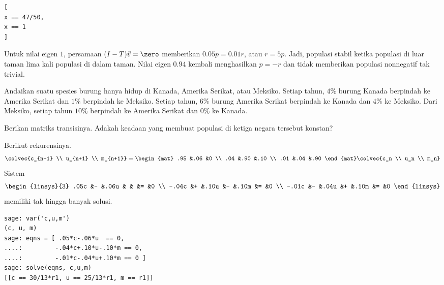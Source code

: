 \begin{exercises}
\begin{answer}
\begin{lstlisting}
[
x == 47/50,
x == 1
]
\end{lstlisting}
      Untuk nilai eigen $1$, persamaan $(I-T)\vec v=\zero$ memberikan
      $0.05p=0.01r$, atau $r=5p$. Jadi, populasi stabil ketika populasi di luar
      taman lima kali populasi di dalam taman. Nilai eigen $0.94$ kembali
      menghasilkan $p=-r$ dan tidak memberikan populasi nonnegatif tak trivial.
    \end{answer}
  \item 
    Andaikan suatu spesies burung hanya hidup di Kanada, Amerika Serikat, atau
    Meksiko. Setiap tahun, $4\%$ burung Kanada berpindah ke Amerika Serikat dan
    $1\%$ berpindah ke Meksiko. Setiap tahun, $6\%$ burung Amerika Serikat
    berpindah ke Kanada dan $4\%$ ke Meksiko. Dari Meksiko, setiap tahun $10\%$
    berpindah ke Amerika Serikat dan $0\%$ ke Kanada.
    \begin{exparts}
      \partsitem Berikan matriks transisinya.
      \partsitem Adakah keadaan yang membuat populasi di ketiga negara
         tersebut konstan?  
    \end{exparts}
    \begin{answer}
      \begin{exparts}
        \partsitem Berikut rekurensinya.
          \begin{equation*}
            \colvec{c_{n+1} \\ u_{n+1} \\ m_{n+1}}
            =
            \begin{mat}
              .95  &.06  &0  \\
              .04  &.90  &.10  \\
              .01  &.04  &.90
            \end{mat}
            \colvec{c_n \\ u_n  \\ m_n}
          \end{equation*}
        \partsitem Sistem
          \begin{equation*}
            \begin{linsys}{3}
              .05c &- &.06u &  &     &= &0  \\
             -.04c &+ &.10u &- &.10m &= &0  \\
             -.01c &- &.04u &+ &.10m &= &0
            \end{linsys}
          \end{equation*}
          memiliki tak hingga banyak solusi.
\begin{lstlisting}
sage: var('c,u,m')
(c, u, m)
sage: eqns = [ .05*c-.06*u  == 0,
....:         -.04*c+.10*u-.10*m == 0,
....:         -.01*c-.04*u+.10*m == 0 ]
sage: solve(eqns, c,u,m)
[[c == 30/13*r1, u == 25/13*r1, m == r1]]            
\end{lstlisting}
      \end{exparts}
    \end{answer}
\end{exercises}
\endinput



